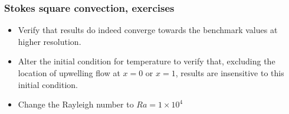 %
\begin{frame}
    \frametitle{Stokes square convection, exercises}
\begin{itemize}
\item Verify that results do indeed converge towards the benchmark values at higher resolution.
\item Alter the initial condition for temperature to verify that, excluding the location of upwelling
flow at $x = 0$ or $x = 1$, results are insensitive to this initial condition.
\item Change the Rayleigh number to $Ra = 1 \times 10^4$
\end{itemize}
\end{frame}

